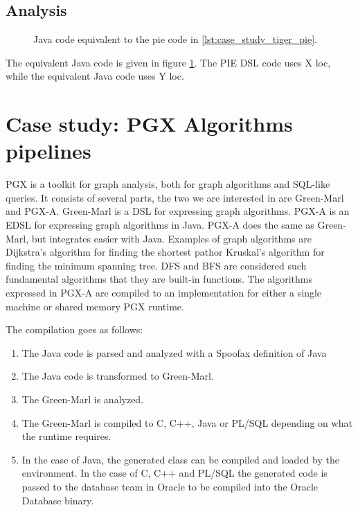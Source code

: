 \subsection{Analysis}
\label{sec:evaluation__tiger__analysis}

\begin{figure}
  \caption{Java code equivalent to the pie code in \ref{lst:case_study_tiger_pie}.}
  \label{lst:case_study_tiger_java}
\end{figure}

The equivalent Java code is given in figure \ref{lst:case_study_tiger_java}.
The \ac{PIE} \ac{DSL} code uses X \ac{loc}, while the equivalent Java code uses Y \ac{loc}.

\section{Case study: PGX Algorithms pipelines}
\label{sec:evaluation__database}

\Ac{PGX} is a toolkit for graph analysis, both for graph algorithms and SQL-like queries.
It consists of several parts, the two we are interested in are Green-Marl and \ac{PGX-A}.
Green-Marl is a \ac{DSL} for expressing graph algorithms.
\Ac{PGX-A} is an \ac{EDSL} for expressing graph algorithms in Java.
\Ac{PGX-A} does the same as Green-Marl, but integrates easier with Java.
Examples of graph algorithms are Dijkstra's algorithm for finding the shortest path\missingref or Kruskal's algorithm for finding the minimum spanning tree\missingref.
\Ac{DFS} and \ac{BFS} are considered such fundamental algorithms that they are built-in functions.
The algorithms expressed in \ac{PGX-A} are compiled to an implementation for either a single machine or shared memory \ac{PGX} runtime.

The compilation goes as follows:
\begin{enumerate}
  \item The Java code is parsed and analyzed with a Spoofax definition of Java
  \item The Java code is transformed to Green-Marl.
  \item The Green-Marl is analyzed.
  \item The Green-Marl is compiled to C, C++, Java or \ac{PL/SQL} depending on what the runtime requires.
  \item In the case of Java, the generated class can be compiled and loaded by the environment. In the case of C, C++ and \ac{PL/SQL} the generated code is passed to the database team in Oracle to be compiled into the Oracle Database binary.
\end{enumerate}



